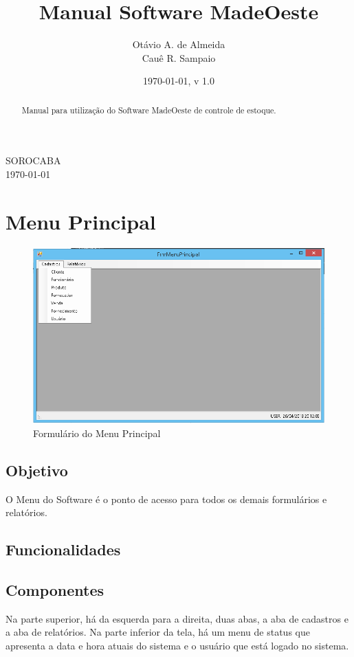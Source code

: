 \documentclass[12pt, a4paper,  article, brazil]{abntex2}
\title{Manual Software MadeOeste}
\author{
	Otávio A. de Almeida\\
	Cauê R. Sampaio
}
\date{\today, v 1.0}
\begin{document}
	\begin{center}
	\maketitle
	\begin{abstract}
		Manual para utilização do Software MadeOeste de controle de estoque.
	\end{abstract}
	\vfill
	{SOROCABA\\
	\today}
	\end{center}
	\newpage
	\tableofcontents
	\newpage
	\section{Menu Principal}
		\begin{figure}[!htb]
			\centering
			\includegraphics[scale=0.7]{../Figuras/FrmMenu.png}
			\caption{Formulário do Menu Principal}
		\end{figure}
		\subsection{Objetivo}
		O Menu do Software é o ponto de acesso para todos os demais formulários e relatórios.
		\subsection{Funcionalidades}
		\subsection{Componentes}
		Na parte superior, há da esquerda para a direita, duas abas, a aba de cadastros e a aba de relatórios.
		Na parte inferior da tela, há um menu de status que apresenta a data e hora atuais do sistema e o usuário que está logado no sistema.
\end{document}
